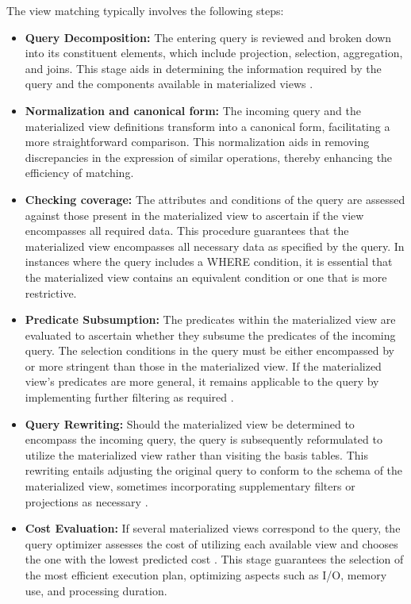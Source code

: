  The view matching typically involves the following steps:
  \begin{itemize}
      \item \textbf{Query Decomposition:} The entering query is reviewed and broken down into its constituent elements, which include projection, selection, aggregation, and joins. This stage aids in determining the information required by the query and the components available in materialized views \cite{theodoratos2000decomposition}.

      \item \textbf{Normalization and canonical form:} The incoming query and the materialized view definitions transform into a canonical form, facilitating a more straightforward comparison.
This normalization aids in removing discrepancies in the expression of similar operations, thereby enhancing the efficiency of matching.

     \item \textbf{Checking coverage:} The attributes and conditions of the query are assessed against those present in the materialized view to ascertain if the view encompasses all required data. This procedure guarantees that the materialized view encompasses all necessary data as specified by the query. In instances where the query includes a WHERE condition, it is essential that the materialized view contains an equivalent condition or one that is more restrictive.
     
      \item \textbf{Predicate Subsumption:} The predicates within the materialized view are evaluated to ascertain whether they subsume the predicates of the incoming query. The selection conditions in the query must be either encompassed by or more stringent than those in the materialized view. If the materialized view's predicates are more general, it remains applicable to the query by implementing further filtering as required \cite{adali1996query}.

      \item \textbf{Query Rewriting:} Should the materialized view be determined to encompass the incoming query, the query is subsequently reformulated to utilize the materialized view rather than visiting the basis tables. This rewriting entails adjusting the original query to conform to the schema of the materialized view, sometimes incorporating supplementary filters or projections as necessary \cite{haldar2001query}.

         \item \textbf{Cost Evaluation:} If several materialized views correspond to the query, the query optimizer assesses the cost of utilizing each available view and chooses the one with the lowest predicted cost \cite{hulgeri2001cost}.
This stage guarantees the selection of the most efficient execution plan, optimizing aspects such as I/O, memory use, and processing duration.

  \end{itemize}


